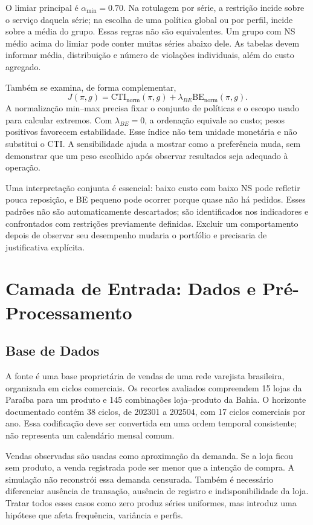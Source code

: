 O limiar principal é $\alpha_{\min}=0.70$. Na rotulagem por série, a restrição incide sobre o serviço daquela série; na escolha de uma política global ou por perfil, incide sobre a média do grupo. Essas regras não são equivalentes. Um grupo com NS médio acima do limiar pode conter muitas séries abaixo dele. As tabelas devem informar média, distribuição e número de violações individuais, além do custo agregado.

Também se examina, de forma complementar,
\[
J(\pi,g)=\mathrm{CTI}_{\mathrm{norm}}(\pi,g)+\lambda_{BE}\mathrm{BE}_{\mathrm{norm}}(\pi,g).
\]
A normalização min--max precisa fixar o conjunto de políticas e o escopo usado para calcular extremos. Com $\lambda_{BE}=0$, a ordenação equivale ao custo; pesos positivos favorecem estabilidade. Esse índice não tem unidade monetária e não substitui o CTI. A sensibilidade ajuda a mostrar como a preferência muda, sem demonstrar que um peso escolhido após observar resultados seja adequado à operação.

Uma interpretação conjunta é essencial: baixo custo com baixo NS pode refletir pouca reposição, e BE pequeno pode ocorrer porque quase não há pedidos. Esses padrões não são automaticamente descartados; são identificados nos indicadores e confrontados com restrições previamente definidas. Excluir um comportamento depois de observar seu desempenho mudaria o portfólio e precisaria de justificativa explícita.

\section{Camada de Entrada: Dados e Pré-Processamento}
\subsection{Base de Dados}

A fonte é uma base proprietária de vendas de uma rede varejista brasileira, organizada em ciclos comerciais. Os recortes avaliados compreendem 15 lojas da Paraíba para um produto e 145 combinações loja--produto da Bahia. O horizonte documentado contém 38 ciclos, de 202301 a 202504, com 17 ciclos comerciais por ano. Essa codificação deve ser convertida em uma ordem temporal consistente; não representa um calendário mensal comum.

Vendas observadas são usadas como aproximação da demanda. Se a loja ficou sem produto, a venda registrada pode ser menor que a intenção de compra. A simulação não reconstrói essa demanda censurada. Também é necessário diferenciar ausência de transação, ausência de registro e indisponibilidade da loja. Tratar todos esses casos como zero produz séries uniformes, mas introduz uma hipótese que afeta frequência, variância e perfis.

